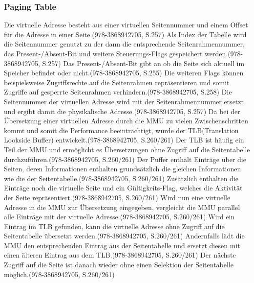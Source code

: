 \subsubsection{Paging Table}
Die virtuelle Adresse besteht aus einer virtuellen Seitennummer und einem Offset für die Adresse in einer Seite.(978-3868942705, S.257) Als Index der Tabelle wird die Seitennummer genutzt zu der dann die entsprechende Seitenrahmennummer, das Present-/Absent-Bit und weitere Steuerungs-Flags gespeichert werden.(978-3868942705, S.257) Das Present-/Absent-Bit gibt an ob die Seite sich aktuell im Speicher befindet oder nicht.(978-3868942705, S.255) Die weiteren Flags können beispielsweise Zugriffsrechte auf die Seitenrahmen repräsentieren und somit Zugriffe auf gesperrte Seitenrahmen verhindern.(978-3868942705, S.258) Die Seitennummer der virtuellen Adresse wird mit der Seitenrahmennummer ersetzt und ergibt damit die physikalische Adresse.(978-3868942705, S.257)
Da bei der Übersetzung einer virtuellen Adresse durch die MMU zu vielen Zwischenschritten kommt und somit die Performance beeinträchtigt, wurde der TLB(Translation Lookside Buffer) entwickelt.(978-3868942705, S.260/261) Der TLB ist häufig ein Teil der MMU und ermöglicht es Übersetzungen ohne Zugriff auf die Seitentabelle durchzuführen.(978-3868942705, S.260/261) Der Puffer enthält Einträge über die Seiten, deren Informationen enthalten grundsätzlich die gleichen Informationen wie die der Seitentabelle.(978-3868942705, S.260/261) Zusätzlich enthalten die Einträge noch die virtuelle Seite und ein Gültigkeits-Flag, welches die Aktivität der Seite repräsentiert.(978-3868942705, S.260/261) Wird nun eine virtuelle Adresse in die MMU zur Übersetzung eingegeben, vergleicht die MMU parallel alle Einträge mit der virtuelle Adresse.(978-3868942705, S.260/261) Wird ein Eintrag im TLB gefunden, kann die virtuelle Adresse ohne Zugriff auf die Seitentabelle übersetzt werden.(978-3868942705, S.260/261) Andernfalls lädt die MMU den entsprechenden Eintrag aus der Seitentabelle und ersetzt diesen mit einen älteren Eintrag aus dem TLB.(978-3868942705, S.260/261) Der nächste Zugriff auf die Seite ist danach wieder ohne einen Selektion der Seitentabelle möglich.(978-3868942705, S.260/261)

